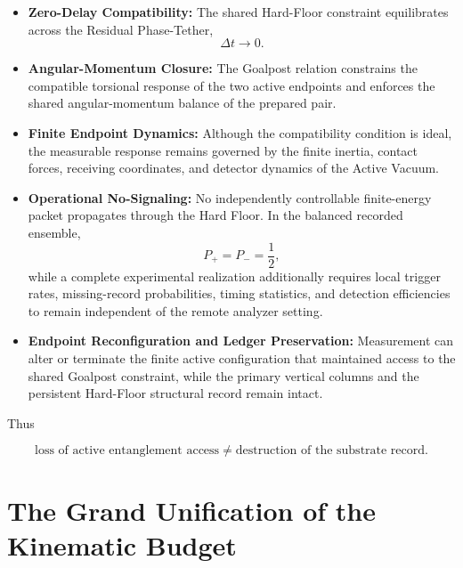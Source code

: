 \begin{itemize}

    \item \textbf{Zero-Delay Compatibility:}
    The shared Hard-Floor constraint equilibrates across the Residual Phase-Tether,
    \begin{equation}
        \Delta t\rightarrow0.
    \end{equation}

    \item \textbf{Angular-Momentum Closure:}
    The Goalpost relation constrains the compatible torsional response of the two active endpoints and enforces the shared angular-momentum balance of the prepared pair.

    \item \textbf{Finite Endpoint Dynamics:}
    Although the compatibility condition is ideal, the measurable response remains governed by the finite inertia, contact forces, receiving coordinates, and detector dynamics of the Active Vacuum.

    \item \textbf{Operational No-Signaling:}
    No independently controllable finite-energy packet propagates through the Hard Floor. In the balanced recorded ensemble,
    \begin{equation}
        P_{+}=P_{-}=\frac12,
    \end{equation}
    while a complete experimental realization additionally requires local trigger rates, missing-record probabilities, timing statistics, and detection efficiencies to remain independent of the remote analyzer setting.

    \item \textbf{Endpoint Reconfiguration and Ledger Preservation:}
    Measurement can alter or terminate the finite active configuration that maintained access to the shared Goalpost constraint, while the primary vertical columns and the persistent Hard-Floor structural record remain intact.

\end{itemize}

Thus

\begin{equation}
    \text{loss of active entanglement access}
    \neq
    \text{destruction of the substrate record}.
\end{equation}

\section{The Grand Unification of the Kinematic Budget}
\label{sec:kinematic_budget_unification}

